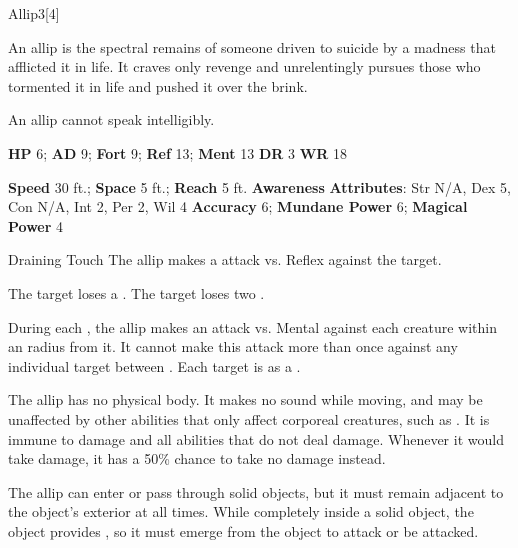   \begin{monsection}{Allip}{3}[4]
    \vspace{-1em}\vspace{-1em}
    \vspace{0em}

    
      An allip is the spectral remains of someone driven to suicide by a madness that afflicted it in life.
      It craves only revenge and unrelentingly pursues those who tormented it in life and pushed it over the brink.

      An allip cannot speak intelligibly.
    

    \begin{spellcontent}
      \begin{spelltargetinginfo}
        \pari \textbf{HP} 6;
          \textbf{AD} 9;
          \textbf{Fort} 9;
          \textbf{Ref} 13;
          \textbf{Ment} 13
        \pari \textbf{DR} 3
        \pari \textbf{WR} 18
        
      \end{spelltargetinginfo}
    \end{spellcontent}
    \begin{monsterfooter}
      \pari \textbf{Speed} 30 ft.;
        \textbf{Space} 5 ft.;
        \textbf{Reach} 5 ft.
      \pari \textbf{Awareness} 
      \pari \textbf{Attributes}:
        Str N/A, Dex 5,
        Con N/A, Int 2,
        Per 2, Wil 4
      \pari \textbf{Accuracy} 6;
        \textbf{Mundane Power} 6;
      \textbf{Magical Power} 4
    \end{monsterfooter}
  \end{monsection}
  \begin{freeability}{Draining Touch}
       The allip makes a  attack
        vs. Reflex against the target.
    
    \hit The target loses a .
    \crit The target loses two .
    \end{freeability}
  
          During each , the allip makes an attack vs. Mental against each creature
          within an \arealarge radius  from it.
          It cannot make this attack more than once against any individual target between .
          \hit Each target is  as a .
        
      The allip has no physical body.
      It makes no sound while moving, and may be unaffected by other abilities that only affect corporeal creatures, such as .
      It is immune to  damage and all  abilities that do not deal damage.
      Whenever it would take damage, it has a 50\% chance to take no damage instead.

      The allip can enter or pass through solid objects, but it must remain adjacent to the object's exterior at all times.
      While completely inside a solid object, the object provides , so it must emerge from the object to attack or be attacked.
  